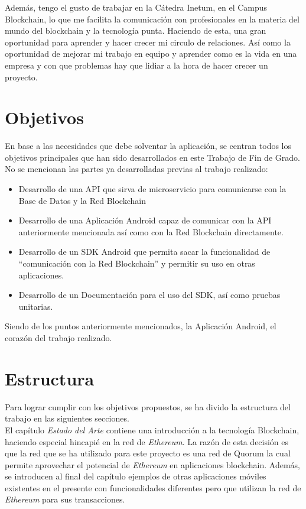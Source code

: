 Además, tengo el gusto de trabajar en la Cátedra Inetum, en el Campus Blockchain, lo que me facilita la comunicación con profesionales en la materia del mundo del blockchain y la tecnología punta. Haciendo de esta, una gran oportunidad para aprender y hacer crecer mi circulo de relaciones. Así como la oportunidad de mejorar mi trabajo en equipo y aprender como es la vida en una empresa y con que problemas hay que lidiar a la hora de hacer crecer un proyecto.

\section{Objetivos}

En base a las necesidades que debe solventar la aplicación, se centran todos los objetivos principales que han sido desarrollados en este Trabajo de Fin de Grado. No se mencionan las partes ya desarrolladas previas al trabajo realizado:
\begin{itemize}
\item Desarrollo de una API que sirva de microservicio para comunicarse con la Base de Datos y la Red Blockchain
\item Desarrollo de una Aplicación Android capaz de comunicar con la API anteriormente mencionada así como con la Red Blockchain directamente.
\item Desarrollo de un SDK Android que permita sacar la funcionalidad de ``comunicación con la Red Blockchain'' y permitir su uso en otras aplicaciones.
\item Desarrollo de un Documentación para el uso del SDK, así como pruebas unitarias.
\end{itemize}
Siendo de los puntos anteriormente mencionados, la Aplicación Android, el corazón del trabajo realizado.

\section{Estructura}
Para lograr cumplir con los objetivos propuestos, se ha divido la estructura del trabajo en las siguientes secciones. \\

El capítulo \emph{Estado del Arte} contiene una introducción a la tecnología Blockchain, haciendo especial hincapié en la red de \emph{Ethereum}\cite{webEthereum}. La razón de esta decisión es que la red que se ha utilizado para este proyecto es una red de Quorum\cite{webQuorum} la cual permite aprovechar el potencial de \emph{Ethereum} en aplicaciones blockchain. Además, se introducen al final del capítulo ejemplos de otras aplicaciones móviles existentes en el presente con funcionalidades diferentes pero que utilizan la red de \emph{Ethereum} para sus transacciones. \\

